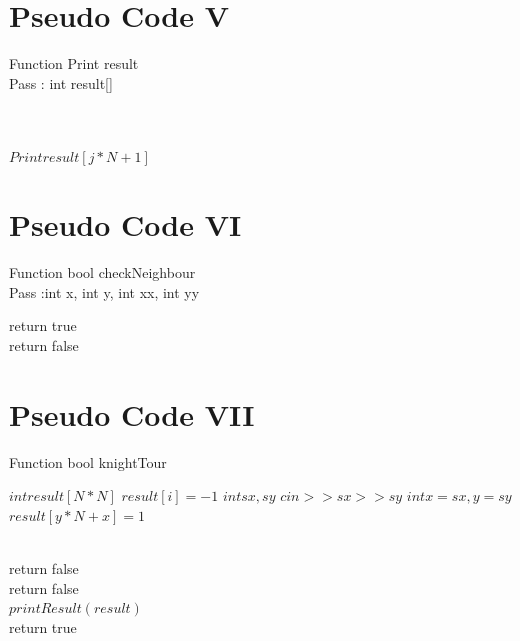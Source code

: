 \documentclass[conference]{IEEEtran}
\begin{document}
\section{\textbf{Pseudo Code V}} 
\noindent Function Print result \\
Pass : int result[]\\
\begin{algorithmic}
 \\
   \\
     $Print result[j*N+1]$\\
    \ENDFOR
  \ENDFOR   
\end{algorithmic}


\section{\textbf{Pseudo Code VI}} 
\noindent Function bool checkNeighbour \\
Pass :int x, int y, int xx, int yy\\
\begin{algorithmic}
			return true\\
	return false\\
\end{algorithmic}
\section{\textbf{Pseudo Code VII}} 
\noindent Function bool knightTour \\
\begin{algorithmic}

	\STATE$int result[N*N]$
		\STATE $result[i] = -1$
	    \STATE $int sx,sy$
	 \STATE $cin>> sx >> sy$
	 \STATE$int x = sx, y = sy$
	\STATE$result[y*N+x] = 1$ 

		\\
			return false\\
		return false\\
    \STATE $printResult(result)$\\
	return true\\
\end{algorithmic}
\end{document}
